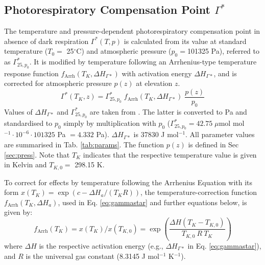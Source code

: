 \documentclass{myreport}
\begin{document}
\subsection{Photorespiratory Compensation Point $\Gamma^\ast$}
\label{sec:gammastar}
The temperature and pressure-dependent photorespiratory compensation point in absence of dark respiration $\Gamma^\ast(T,p)$ is calculated from its value at standard temperature ($T_0=$ 25${^\circ}$C) and atmospheric pressure ($p_0 = $101325 Pa), referred to as $\Gamma^\ast_{25, p_0}$. It is modified by temperature following an Arrhenius-type temperature response function $f_{\text{Arrh}}(T_K, \Delta H_{\Gamma\ast})$ with activation energy $\Delta H_{\Gamma\ast}$, and is corrected for atmospheric pressure $p(z)$ at elevation $z$. 
\begin{equation}
\label{eq:gammastar}
    \Gamma^\ast (T_K, z) = \Gamma^\ast_{25, p_0} \; f_{\text{Arrh}}(T_K, \Delta H_{\Gamma\ast}) \; \frac{p(z)}{p_0}
\end{equation}
Values of $\Delta H_{\Gamma\ast}$ and $\Gamma^\ast_{25, p_0}$ are taken from \citet{bernacchi01}. The latter is converted to Pa and standardised to $p_0$ simply by multiplication with $p_0$ ($\Gamma^\ast_{25, p_0} = 42.75\; \mu$mol mol$^{-1} \cdot 10^{-6} \cdot 101325$ Pa $ = 4.332$ Pa). $\Delta H_{\Gamma\ast}$ is 37830 J mol$^{-1}$. All parameter values are summarised in Tab. \ref{tab:params}. The function $p(z)$ is defined in Sec \ref{sec:press}. Note that $T_K$ indicates that the respective temperature value is given in Kelvin and $T_{K,0}=$ 298.15 K.

To correct for effects by temperature following the Arrhenius Equation with its form $x(T_K)=\exp(c-\Delta H_a/(T_K R))$, the temperature-correction function $f_{\text{Arrh}}(T_K, \Delta H_a)$, used in Eq. \ref{eq:gammastar} and further equations below, is given by:
\begin{equation}
    f_{\text{Arrh}}(T_K) = x(T_K)/x(T_{K,0}) = \exp \left( \frac{\Delta H (T_K - T_{K,0})}{T_{K,0}\: R\: T_K} \right) 
\end{equation}
where $\Delta H$ is the respective activation energy (e.g., $\Delta H_{\Gamma\ast}$ in Eq. \ref{eq:gammastar}), and $R$ is the universal gas constant (8.3145 J mol$^{-1}$ K$^{-1}$).
\end{document}
